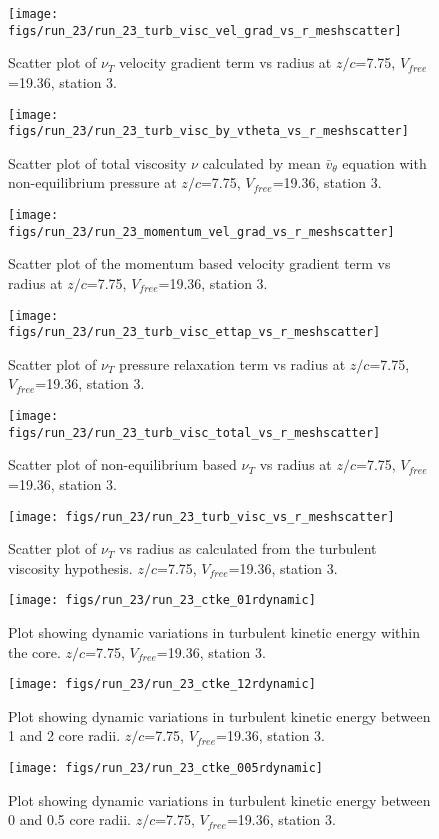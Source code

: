 \begin{figure}[H]
\centering
\texttt{[image: figs/run\_23/run\_23\_turb\_visc\_vel\_grad\_vs\_r\_meshscatter]}
\caption{Scatter plot of $\nu_T$ velocity gradient term vs radius at $z/c$=7.75, $V_{free}$=19.36, station 3.}
\end{figure}


\begin{figure}[H]
\centering
\texttt{[image: figs/run\_23/run\_23\_turb\_visc\_by\_vtheta\_vs\_r\_meshscatter]}
\caption{Scatter plot of total viscosity $\nu$ calculated by mean $\bar{v}_{\theta}$ equation with non-equilibrium pressure at $z/c$=7.75, $V_{free}$=19.36, station 3.}
\end{figure}


\begin{figure}[H]
\centering
\texttt{[image: figs/run\_23/run\_23\_momentum\_vel\_grad\_vs\_r\_meshscatter]}
\caption{Scatter plot of the momentum based velocity gradient term vs radius at $z/c$=7.75, $V_{free}$=19.36, station 3.}
\end{figure}


\begin{figure}[H]
\centering
\texttt{[image: figs/run\_23/run\_23\_turb\_visc\_ettap\_vs\_r\_meshscatter]}
\caption{Scatter plot of $\nu_T$ pressure relaxation term vs radius at $z/c$=7.75, $V_{free}$=19.36, station 3.}
\end{figure}


\begin{figure}[H]
\centering
\texttt{[image: figs/run\_23/run\_23\_turb\_visc\_total\_vs\_r\_meshscatter]}
\caption{Scatter plot of non-equilibrium based $\nu_T$ vs radius at $z/c$=7.75, $V_{free}$=19.36, station 3.}
\end{figure}


\begin{figure}[H]
\centering
\texttt{[image: figs/run\_23/run\_23\_turb\_visc\_vs\_r\_meshscatter]}
\caption{Scatter plot of $\nu_T$ vs radius as calculated from the turbulent viscosity hypothesis. $z/c$=7.75, $V_{free}$=19.36, station 3.}
\end{figure}


\begin{figure}[H]
\centering
\texttt{[image: figs/run\_23/run\_23\_ctke\_01rdynamic]}
\caption{Plot showing dynamic variations in turbulent kinetic energy within the core. $z/c$=7.75, $V_{free}$=19.36, station 3.}
\end{figure}


\begin{figure}[H]
\centering
\texttt{[image: figs/run\_23/run\_23\_ctke\_12rdynamic]}
\caption{Plot showing dynamic variations in turbulent kinetic energy between 1 and 2 core radii. $z/c$=7.75, $V_{free}$=19.36, station 3.}
\end{figure}


\begin{figure}[H]
\centering
\texttt{[image: figs/run\_23/run\_23\_ctke\_005rdynamic]}
\caption{Plot showing dynamic variations in turbulent kinetic energy between 0 and 0.5 core radii. $z/c$=7.75, $V_{free}$=19.36, station 3.}
\end{figure}


